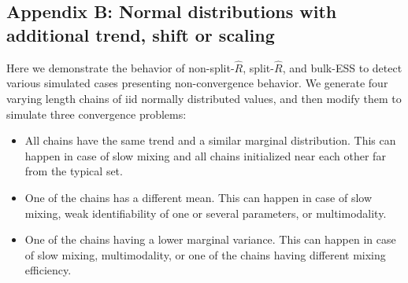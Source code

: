 \documentclass[american,]{article}
\providecommand{\tightlist}{%
  \setlength{\itemsep}{0pt}\setlength{\parskip}{0pt}}
\theoremstyle{definition}
\begin{document}




\hypertarget{AppendixD}{%
\subsection*{Appendix B: Normal distributions with additional trend,
shift or scaling}\label{AppendixD}}

Here we demonstrate the behavior of non-split-\(\widehat{R}\),
split-\(\widehat{R}\), and bulk-ESS to detect various simulated cases
presenting non-convergence behavior. We generate four varying length
chains of iid normally distributed values, and then modify them to
simulate three convergence problems:
\begin{itemize}
\tightlist
\item All chains have the same trend and a similar marginal
  distribution. This can happen in case of slow mixing and all chains
  initialized near each other far from the typical set.
\item One of the chains has a different mean. This can happen in case
  of slow mixing, weak identifiability of one or several parameters, or
  multimodality.
\item One of the chains having a lower marginal variance. This can
  happen in case of slow mixing, multimodality, or one of the chains
  having different mixing efficiency.
\end{itemize}

\end{document}
